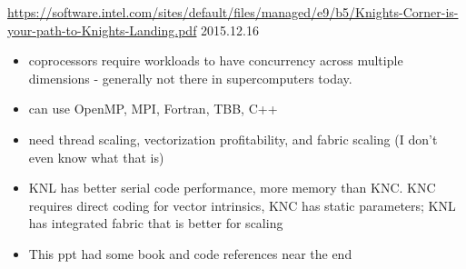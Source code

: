 \documentclass[12pt,twoside]{article}
\begin{document}
\href{https://software.intel.com/sites/default/files/managed/e9/b5/Knights-Corner-is-your-path-to-Knights-Landing.pdf}{https://software.intel.com/sites/default/files/managed/e9/b5/Knights-Corner-is-your-path-to-Knights-Landing.pdf} 2015.12.16
\begin{itemize}
\item coprocessors require workloads to have concurrency across multiple dimensions - generally not there in supercomputers today.
\item can use OpenMP, MPI, Fortran, TBB, C++
\item need thread scaling, vectorization profitability, and fabric scaling (I don't even know what that is)
\item KNL has better serial code performance, more memory than KNC. KNC requires direct coding for vector intrinsics, KNC has static parameters; KNL has integrated fabric that is better for scaling
\item This ppt had some book and code references near the end
\end{itemize}
\end{document}

